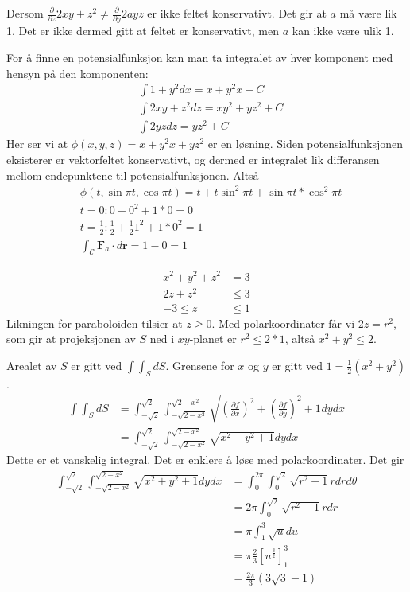 \documentclass[11pt, a4paper, norsk]{NTNUoving}
\begin{document}
\begin{oppgave}
    Dersom $\frac{\partial}{\partial z}2xy+z^2\neq\frac{\partial}{\partial y}2ayz$ er ikke feltet konservativt. Det gir at $a$ må være lik 1. Det er ikke dermed gitt at feltet er konservativt, men $a$ kan ikke være ulik 1. 
    
    For å finne en potensialfunksjon kan man ta integralet av hver komponent med hensyn på den komponenten:
\begin{align*}
    &\int 1+y^2dx = x+y^2x+C
    \\&\int 2xy+z^2dz = xy^2+yz^2+C
    \\&\int 2yzdz = yz^2+C
\end{align*}
Her ser vi at $\phi(x, y, z)=x+y^2x+yz^2$ er en løsning. Siden potensialfunksjonen eksisterer er vektorfeltet konservativt, og dermed er integralet lik differansen mellom endepunktene til potensialfunksjonen. Altså
\begin{align*}
    &\phi(t, \sin\pi t, \cos\pi t)=t+t\sin^2\pi t+\sin\pi t*\cos^2 \pi t\\
    &t=0: 0+0^2+1*0=0\\
    &t=\frac{1}{2}: \frac{1}{2}+\frac{1}{2}1^2+1*0^2=1\\
    &\int_\mathcal{C}\textbf{F}_a\cdot d\textbf{r}=1-0=1
\end{align*}
\end{oppgave}
\begin{oppgave}
    \begin{align*}
        x^2+y^2+z^2&=3\\
        2z+z^2&\leq3\\
        -3 \leq z& \leq 1
    \end{align*}
    Likningen for paraboloiden tilsier at $z\geq 0$. Med polarkoordinater får vi $2z=r^2$, som gir at projeksjonen av $S$ ned i $xy$-planet er $r^2\leq 2*1$, altså $x^2+y^2\leq 2$.
    
    Arealet av $S$ er gitt ved $\int\int_SdS$. Grensene for $x$ og $y$ er gitt ved $1=\frac{1}{2}(x^2+y^2)$.
    \begin{align*}
        \int\int_SdS&=\int_{-\sqrt{2}}^{\sqrt{2}}\int_{-\sqrt{2-x^2}}^{\sqrt{2-x^2}}\sqrt{\left(\frac{\partial f}{\partial x}\right)^2+\left(\frac{\partial f}{\partial y}\right)^2+1}dydx
        \\&=\int_{-\sqrt{2}}^{\sqrt{2}}\int_{-\sqrt{2-x^2}}^{\sqrt{2-x^2}}\sqrt{x^2+y^2+1}dydx
    \end{align*}
    Dette er et vanskelig integral. Det er enklere å løse med polarkoordinater. Det gir
    \begin{align*}
        \int_{-\sqrt{2}}^{\sqrt{2}}\int_{-\sqrt{2-x^2}}^{\sqrt{2-x^2}}\sqrt{x^2+y^2+1}dydx&=\int_0^{2\pi}\int_0^{\sqrt{2}}\sqrt{r^2+1}rdrd\theta
        \\&=2\pi\int_0^{\sqrt{2}}\sqrt{r^2+1}rdr
        \\&=\pi\int_1^3\sqrt{u}du
        \\&=\pi\frac{2}{3}\left[u^\frac{3}{2}\right]_1^3
        \\&=\frac{2\pi}{3}(3\sqrt{3}-1)
    \end{align*}
\end{oppgave}
\end{document}
